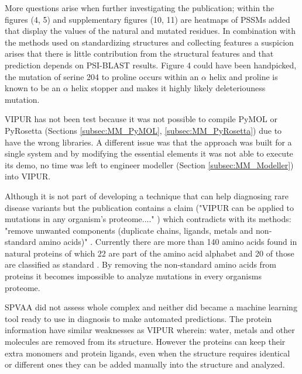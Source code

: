 More questions arise when further investigating the publication; within the figures (4, 5) \cite{baugh_robust_2016} and supplementary figures (10, 11) \cite{baugh_supplementary:_2016} are heatmaps of PSSMs added that display the values of the natural and mutated residues. In combination with the methods used on standardizing structures and collecting features a suspicion arises that there is little contribution from the structural features and that prediction depends on PSI-BLAST results. Figure 4 could have been handpicked, the mutation of serine 204 to proline occurs within an $\alpha$ helix and proline is known to be an $\alpha$ helix stopper \cite{li_alpha-helical_1996} and makes it highly likely deleteriouness mutation.

VIPUR has not been test because it was not possible to compile PyMOL or PyRosetta (Sections \ref{subsec:MM_PyMOL}, \ref{subsec:MM_PyRosetta}) due to have the wrong libraries. A different issue was that the approach was built for a single system and by modifying the essential elements it was not able to execute its demo, no time was left to engineer modeller (Section \ref{subsec:MM_Modeller}) into VIPUR.



Although it is not part of developing a technique that can help diagnosing rare disease variants but the publication contains a claim ("VIPUR can be applied to mutations in any organism’s proteome...." \cite{baugh_robust_2016}) which contradicts with its methods: "remove unwanted components (duplicate chains, ligands, metals and non-standard amino acids)" \cite{baugh_robust_2016}. Currently there are more than 140 amino acids found in natural proteins of which 22 are part of the amino acid alphabet and 20 of those are classified as standard \cite{ambrogelly_natural_2007}. By removing the non-standard amino acids from proteins it becomes impossible to analyze mutations in every organisms proteome.

SPVAA did not assess whole complex and neither did became a machine learning tool ready to use in diagnosis to make automated predictions. The protein information have similar weaknesses as VIPUR wherein: water, metals and other molecules are removed from its structure. However the proteins can keep their extra monomers and protein ligands, even when the structure requires identical or different ones they can be added manually into the structure and analyzed. 

